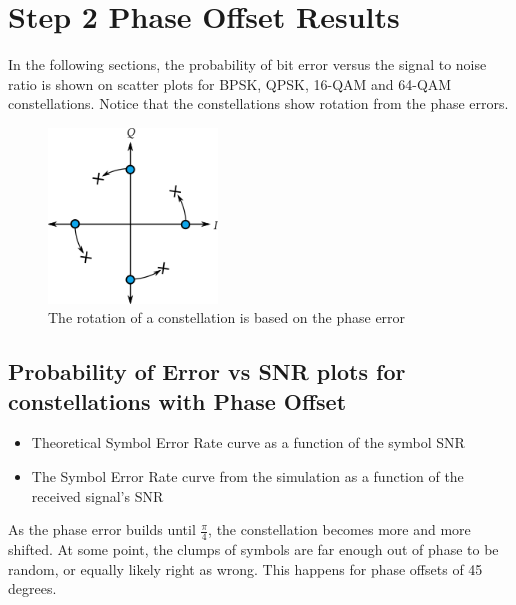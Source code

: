 \documentclass[]{article}
\begin{document}
\section{Step 2 Phase Offset Results}
\label{sec:results_po}
In the following sections, the probability of bit error versus the signal to noise ratio is shown on scatter plots for BPSK, QPSK, 16-QAM and 64-QAM constellations.  Notice that the constellations show rotation from the phase errors.  

\begin{figure}[H]
\centering
\hspace*{-2cm}\includegraphics[width=0.4\textwidth]{qpskError.png}
\caption{The rotation of a constellation is based on the phase error}
\end{figure}

\subsection{Probability of Error vs SNR plots for constellations with Phase Offset}
\begin{itemize}
\item Theoretical Symbol Error Rate curve as a function of the symbol SNR
\item The Symbol Error Rate curve from the simulation as a function of the received signal's SNR
\end{itemize}

As the phase error builds until $\frac{\pi}{4}$, the constellation becomes more and more shifted.  At some point, the clumps of symbols are far enough out of phase to be random, or equally likely right as wrong.  This happens for phase offsets of 45 degrees.
\end{document}
